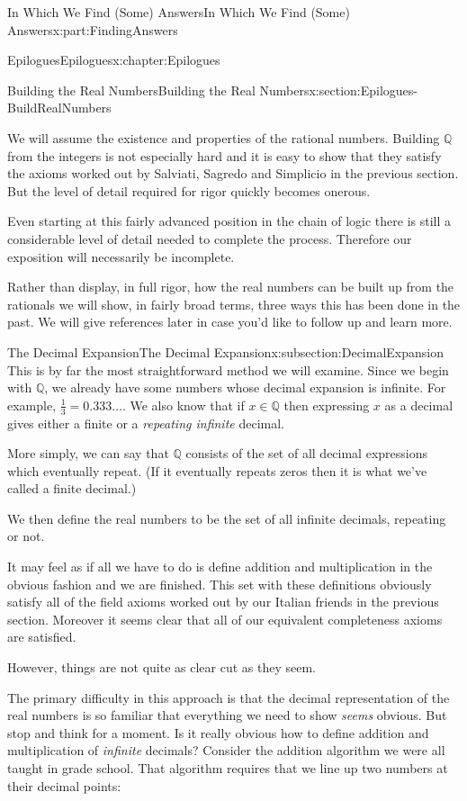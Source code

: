 \documentclass[oneside,10pt,]{book}
\numberwithin{equation}{section}
\newcommand{\QQ}{\mathbb {Q}}
\begin{document}
\begin{partptx}{In Which We Find (Some) Answers}{}{In Which We Find (Some) Answers}{}{}{x:part:FindingAnswers}
\begin{chapterptx}{Epilogues}{}{Epilogues}{}{}{x:chapter:Epilogues}
\begin{sectionptx}{Building the Real Numbers}{}{Building the Real Numbers}{}{}{x:section:Epilogues-BuildRealNumbers}
\begin{introduction}{}
\par
We will assume the existence and properties of the rational numbers.  Building \(\QQ\) from the integers is not especially hard and it is easy to show that they satisfy the axioms worked out by Salviati, Sagredo and Simplicio in the previous section.  But the level of detail required for rigor quickly becomes onerous.%
\par
Even starting at this fairly advanced position in the chain of logic there is still a considerable level of detail needed to complete the process. Therefore our exposition will necessarily be incomplete.%
\par
Rather than display, in full rigor, how the real numbers can be built up from the rationals we will show, in fairly broad terms, three ways this has been done in the past. We will give references later in case you'd like to follow up and learn more.%
\end{introduction}%
%
%
\typeout{************************************************}
\typeout{************************************************}
%
\begin{subsectionptx}{The Decimal Expansion}{}{The Decimal Expansion}{}{}{x:subsection:DecimalExpansion}
This is by far the most straightforward method we will examine. Since we begin with \(\QQ\), we already have some numbers whose decimal expansion is infinite. For example, \(\frac13= 0.333\ldots\). We also know that if \(x\in\QQ\) then expressing \(x\) as a decimal gives either a finite or a \emph{repeating infinite} decimal.%
\par
More simply, we can say that \(\QQ\) consists of the set of all decimal expressions which eventually repeat. (If it eventually repeats zeros then it is what we've called a finite decimal.)%
\par
We then define the real numbers to be the set of all infinite decimals, repeating or not.%
\par
It may feel as if all we have to do is define addition and multiplication in the obvious fashion and we are finished. This set with these definitions obviously satisfy all of the field axioms worked out by our Italian friends in the previous section. Moreover it seems clear that all of our equivalent completeness axioms are satisfied.%
\par
However, things are not quite as clear cut as they seem.%
\par
The primary difficulty in this approach is that the decimal representation of the real numbers is so familiar that everything we need to show \emph{seems} obvious. But stop and think for a moment. Is it really obvious how to define addition and multiplication of \emph{infinite} decimals? Consider the addition algorithm we were all taught in grade school. That algorithm requires that we line up two numbers at their decimal points:%

\end{subsectionptx}
\end{sectionptx}
\end{chapterptx}
\end{partptx}
\end{document}
